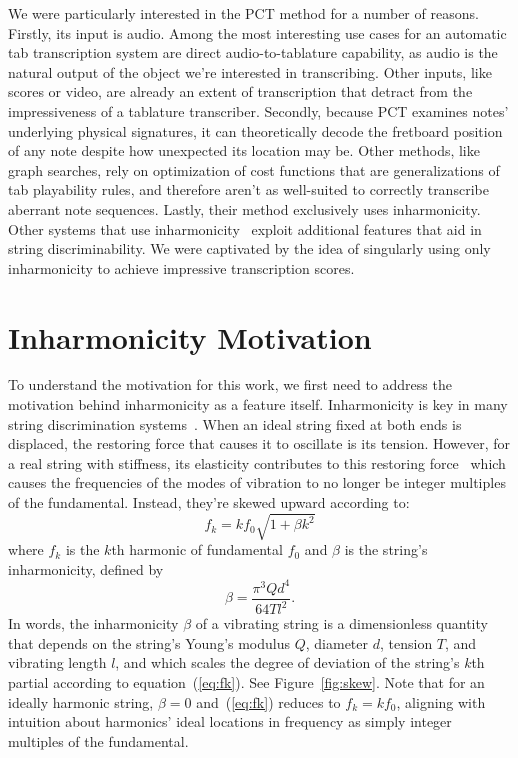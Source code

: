 \documentclass[12pt]{cmuthesis}
\begin{document}
We were particularly interested in the PCT method for a number of reasons. Firstly, its input is audio. Among the most interesting use cases for an automatic tab transcription system are direct audio-to-tablature capability, as audio is the natural output of the object we're interested in transcribing. Other inputs, like scores or video, are already an extent of transcription that detract from the impressiveness of a tablature transcriber. Secondly, because PCT examines notes' underlying physical signatures, it can theoretically decode the fretboard position of any note despite how unexpected its location may be. Other methods, like graph searches, rely on optimization of cost functions that are generalizations of tab playability rules, and therefore aren't as well-suited to correctly transcribe aberrant note sequences. Lastly, their method exclusively uses inharmonicity. Other systems that use inharmonicity~\cite{barbancho2009,abesser2012,dittmar2013,kehling2014} exploit additional features that aid in string discriminability. We were captivated by the idea of singularly using only inharmonicity to achieve impressive transcription scores.

\section{Inharmonicity Motivation}
To understand the motivation for this work, we first need to address the motivation behind inharmonicity as a feature itself. Inharmonicity is key in many string discrimination systems~\cite{barbanchoi2012,abesser2012,dittmar2013,kehling2014}. When an ideal string fixed at both ends is displaced, the restoring force that causes it to oscillate is its tension. However, for a real string with stiffness, its elasticity contributes to this restoring force~\cite{fletcher1962} which causes the frequencies of the modes of vibration to no longer be integer multiples of the fundamental. Instead, they're skewed upward according to: 
\begin{equation}
\label{eq:fk}
f_k = kf_{0}\sqrt{1+\beta k^2}
\end{equation}
where $f_k$ is the $k$th harmonic of fundamental $f_0$ and $\beta$ is the string's inharmonicity, defined by
\begin{equation}
\beta = \frac{\pi^3 Q d^4}{64 T l^2}. \label{eq:beta}
\end{equation}
In words, the inharmonicity $\beta$ of a vibrating string is a dimensionless quantity that depends on the string's Young's modulus $Q$, diameter $d$, tension $T$, and vibrating length $l$, and which scales the degree of deviation of the string's $k$th partial according to equation~(\ref{eq:fk}). See Figure~\ref{fig:skew}. Note that for an ideally harmonic string, $\beta = 0$ and~(\ref{eq:fk}) reduces to $f_k = kf_0$, aligning with intuition about harmonics' ideal locations in frequency as simply integer multiples of the fundamental.
\end{document}
